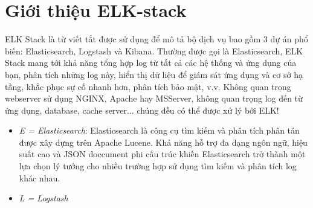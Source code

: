 \section{Giới thiệu ELK-stack}
ELK Stack là từ viết tắt được sử dụng để mô tả bộ dịch vụ bao gồm 3 dự án phổ biến: Elasticsearch, Logstash và Kibana. Thường được gọi là Elasticsearch, ELK Stack mang tới khả năng tổng hợp log từ tất cả các hệ thống và ứng dụng của bạn, phân tích những log này, hiển thị dữ liệu để giám sát ứng dụng và cơ sở hạ tầng, khắc phục sự cố nhanh hơn, phân tích bảo mật, v.v. Không quan trọng webserver sử dụng NGINX, Apache hay MSServer, không quan trọng log đến từ ứng dụng, database, cache server... chúng đều có thể được xử lý bởi ELK!

\begin{itemize}
    \item \textit{E = Elasticsearch}: Elasticsearch là công cụ tìm kiếm và phân tích phân tán được xây dựng trên Apache Lucene. Khả năng hỗ trợ đa dạng ngôn ngữ, hiệu suất cao và JSON doccument phi cấu trúc khiến Elasticsearch trở thành một lựa chọn lý tưởng cho nhiều trường hợp sử dụng tìm kiếm và phân tích log khác nhau.
    \item \textit{L = Logstash}
\end{itemize}